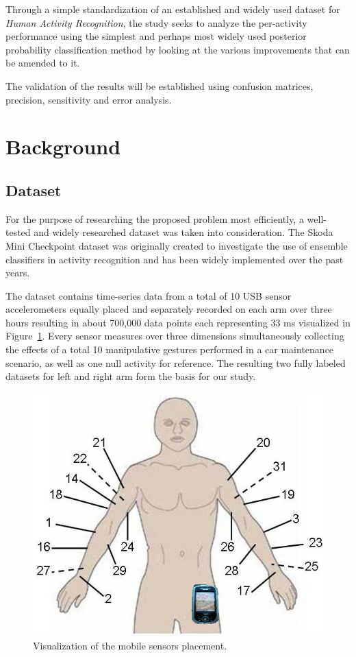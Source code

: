 \documentclass{sig-alternate}
\begin{document}
Through a simple standardization of an established and widely used dataset for \textit{Human Activity Recognition}, the study seeks to analyze the per-activity performance using the simplest and perhaps most widely used posterior probability classification method by looking at the various improvements that can be amended to it.

The validation of the results will be established using confusion matrices, precision, sensitivity and error analysis.


\section{Background}

\subsection{Dataset}
For the purpose of researching the proposed problem most efficiently, a well-tested and widely researched dataset was taken into consideration. The Skoda Mini Checkpoint dataset was originally created to investigate the use of ensemble classifiers in activity recognition and has been widely implemented over the past years\cite{Zappi08}. 

The dataset contains time-series data from a total of 10 USB sensor accelerometers equally placed and separately recorded on each arm over three hours resulting in about 700,000 data points each representing 33 ms visualized in Figure~\ref{fig:body_sensors}. Every sensor measures over three dimensions simultaneously collecting the effects of a total 10 manipulative gestures performed in a car maintenance scenario, as well as one null activity for reference. The resulting two fully labeled datasets for left and right arm form the basis for our study. 

\begin{figure}
\begin{center}
  \includegraphics[width=0.6\linewidth]{non_tech_imgs/Body_Sensors.png}
\end{center}
  \caption{Visualization of the mobile sensors placement.}
  \label{fig:body_sensors}
\end{figure}
\end{document}
